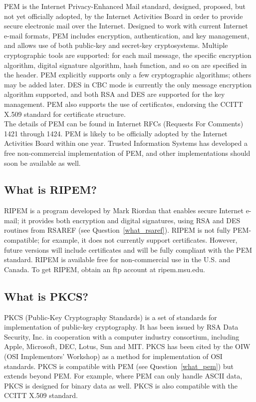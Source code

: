 PEM is the Internet Privacy-Enhanced Mail standard, designed, proposed,
but not yet officially adopted, by the Internet Activities Board in
order to provide secure electronic mail over the Internet. Designed to
work with current Internet e-mail formats, PEM includes encryption,
authentication, and key management, and allows use of both public-key
and secret-key cryptosystems. Multiple cryptographic tools are
supported: for each mail message, the specific encryption algorithm,
digital signature algorithm, hash function, and so on are specified in
the header. PEM explicitly supports only a few cryptographic
algorithms; others may be added later. DES in CBC mode is currently the
only message encryption algorithm supported, and both RSA and DES are
supported for the key management. PEM also supports the use of
certificates, endorsing the CCITT X.509 standard for certificate
structure.\\

The details of PEM can be found in Internet RFCs (Requests For
Comments) 1421 through 1424. PEM is likely to be officially adopted by
the Internet Activities Board within one year. Trusted Information
Systems has developed a free non-commercial implementation of PEM, and
other implementations should soon be available as well.

\subsection{What is RIPEM?}

RIPEM is a program developed by Mark Riordan that enables secure Internet
e-mail; it provides both encryption and digital signatures, using RSA and
DES routines from RSAREF (see Question~\ref{what_rsaref}). RIPEM is not
fully PEM-compatible; for example, it does not currently support
certificates. However, future versions will include certificates and will
be fully compliant with the PEM standard. RIPEM is available free for
non-commercial use in the U.S. and Canada. To get RIPEM, obtain an ftp
account at ripem.msu.edu.

\subsection{What is PKCS?}
\label{what_pkcs}

PKCS (Public-Key Cryptography Standards) is a set of standards for
implementation of public-key cryptography. It has been issued by RSA Data
Security, Inc. in cooperation with a computer industry consortium,
including Apple, Microsoft, DEC, Lotus, Sun and MIT. PKCS has been cited by
the OIW (OSI Implementors' Workshop) as a method for implementation of OSI
standards. PKCS is compatible with PEM (see Question~\ref{what_pem}) but
extends beyond PEM. For example, where PEM can only handle ASCII data, PKCS
is designed for binary data as well. PKCS is also compatible with the CCITT
X.509 standard.\\

